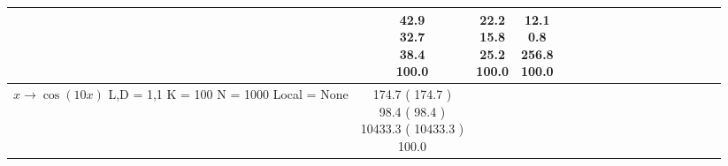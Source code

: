\documentclass[9pt]{article}
\begin{document}
\begin{landscape}
\begin{longtable}{ l | c c c c | c c c c | c c c c | c c c c |}
             &
                            \makecell{              \textbf{ 42.9 }
     \\
            {\footnotesize             \textbf{ 32.7 }
    } \\  {\footnotesize             38.4
     } \\
            {\small \textcolor[rgb]{ 0.2 , 0.7 , 0.1} {100.0  }
} }
             &                         \makecell{              22.2
     \\
            {\footnotesize             15.8
    } \\  {\footnotesize             25.2
     } \\
            {\small \textcolor[rgb]{ 0.2 , 0.7 , 0.1} {100.0  }
} }
             &
                            \makecell{              12.1
     \\
            {\footnotesize             0.8
    } \\  {\footnotesize             256.8
     } \\
            {\small \textcolor[rgb]{ 0.2 , 0.7 , 0.1} {100.0  }
} }
            

 \\
                                                            
                    \hline
                    \makecell{ \textbf{ $x \rightarrow \cos(10x) $} \\
                    { \small L,D = 1,1} \\
                    {\small K = 100} \\
                    {\small N = 1000 } \\ {\small Local = None }} &
                    
                            \makecell{              174.7
     (             174.7
    ) \\
            {\footnotesize             98.4
     (              98.4
     )} \\
            {\footnotesize             10433.3
     (            10433.3
    ) } \\
            {\small  \textcolor[rgb]{ 0.2 , 0.7 , 0.1} {100.0  }
} }



\end{longtable}
\end{landscape}
\end{document}
